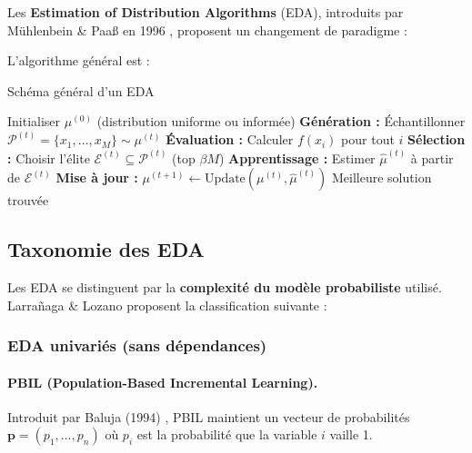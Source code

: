 \documentclass[12pt,a4paper]{article}
\theoremstyle{definition}
\theoremstyle{remark}
\begin{document}
Les \textbf{Estimation of Distribution Algorithms} (EDA), introduits par Mühlenbein \& Paaß en 1996 \cite{muhlenbein1996recombination}, proposent un changement de paradigme :

\begin{center}
\end{center}

L'algorithme général est :

\begin{algorithm}[H]
\caption{Schéma général d'un EDA}
\begin{algorithmic}[1]
\State Initialiser $\mu^{(0)}$ (distribution uniforme ou informée)
    \State \textbf{Génération :} Échantillonner $\mathcal{P}^{(t)} = \{x_1, \ldots, x_M\} \sim \mu^{(t)}$
    \State \textbf{Évaluation :} Calculer $f(x_i)$ pour tout $i$
    \State \textbf{Sélection :} Choisir l'élite $\mathcal{E}^{(t)} \subseteq \mathcal{P}^{(t)}$ (top $\beta M$)
    \State \textbf{Apprentissage :} Estimer $\hat{\mu}^{(t)}$ à partir de $\mathcal{E}^{(t)}$
    \State \textbf{Mise à jour :} $\mu^{(t+1)} \leftarrow \text{Update}(\mu^{(t)}, \hat{\mu}^{(t)})$
\EndFor
\State \Return Meilleure solution trouvée
\end{algorithmic}
\end{algorithm}

\subsection{Taxonomie des EDA}

Les EDA se distinguent par la \textbf{complexité du modèle probabiliste} utilisé. Larrañaga \& Lozano \cite{larranaga2002estimation} proposent la classification suivante :

\subsubsection{EDA univariés (sans dépendances)}

\paragraph{PBIL (Population-Based Incremental Learning).}
Introduit par Baluja (1994) \cite{baluja1994population}, PBIL maintient un vecteur de probabilités $\mathbf{p} = (p_1, \ldots, p_n)$ où $p_i$ est la probabilité que la variable $i$ vaille 1.
\end{document}
